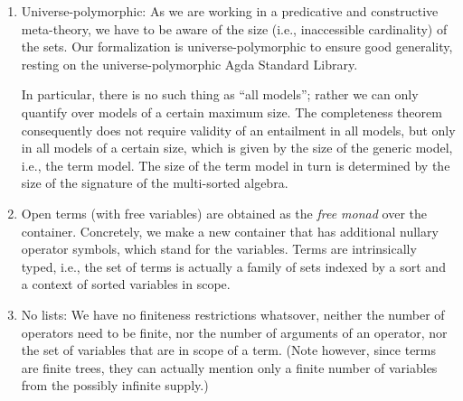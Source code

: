 {\begin{enumerate}
\begin{enumerate}
    \end{enumerate}

    Closed terms of a multi-sorted algebra
    (aka first-order terms) are then
    concrete interaction trees, i.e., elements of the indexed $W$-type
    pertaining to the container.

    Note that all the ``set''s we mentioned above come with a size,
    see next point.

  \item Universe-polymorphic:
    As we are working in a predicative and constructive
    meta-theory, we have to be aware of the size
    (i.e., inaccessible cardinality) of the sets.
    Our formalization is universe-polymorphic to ensure good
    generality, resting on the universe-polymorphic
    Agda Standard Library.

    In particular, there is no such thing as ``all models''; rather we
    can only quantify over models of a certain maximum size.
    The completeness theorem consequently does not require validity of
    an entailment in all models, but only in all models of a certain
    size, which is given by the size of the generic model, i.e., the
    term model.  The size of the term model in turn is determined by
    the size of the signature of the multi-sorted algebra.

  \item Open terms (with free variables) are obtained as the
    \emph{free monad} over the container.  Concretely, we make a new
    container that has additional nullary operator symbols, which
    stand for the variables.
    Terms are intrinsically typed, i.e., the set of terms is actually
    a family of sets indexed by a sort and a context of sorted
    variables in scope.

  \item No lists:
    We have no finiteness restrictions whatsover, neither the number
    of operators need to be finite, nor the number of arguments of an
    operator, nor the set of variables that are in scope of a term.
    (Note however, since terms are finite trees, they can actually
    mention only a finite number of variables from the possibly
    infinite supply.)

  \end{enumerate}
}
%
\newcommand{\CONCLUSION}{%
  Q.E.D.

  \section{Related work}

  \cite{guntherGadeaPagano:lsfa17} further formalize signature
  morphisms.  These would be, in our setting, morphisms of indexed
  containers, described by
  \cite{altenkirchGhaniHancockMcBrideMorris:jfp15}, albeit in a
  slightly different semantics, slice categories.


  \paragraph*{Acknowledgments.}
  \GENERATED
%


}



